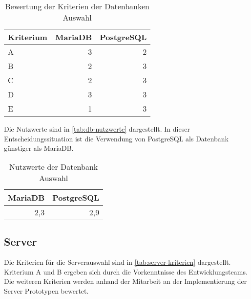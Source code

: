 \begin{table}[h]
	\caption{Bewertung der Kriterien der Datenbanken Auswahl}
	\begin{center}
		\begin{tabular}{lrr}
			\toprule
			Kriterium & \multicolumn{1}{l}{MariaDB} & \multicolumn{1}{l}{PostgreSQL} \\ \midrule
			A         &                           3 &                              2 \\
			B         &                           2 &                              3 \\
			C         &                           2 &                              3 \\
			D         &                           3 &                              3 \\
			E         &                           1 &                              3 \\ \bottomrule
		\end{tabular}
	\end{center}
	\label{tab:db-bewertung}
\end{table}

Die Nutzwerte sind in \autoref{tab:db-nutzwerte} dargestellt.
In dieser Entscheidungssituation ist die Verwendung von PostgreSQL als Datenbank günstiger als MariaDB.

\begin{table}[h]
	\caption{Nutzwerte der Datenbank Auswahl}
	\begin{center}
		\begin{tabular}{rr}
			\toprule
			MariaDB & PostgreSQL \\ \midrule
			2,3 & 2,9 \\ \bottomrule	
		\end{tabular}
	\end{center}
	\label{tab:db-nutzwerte}
\end{table}

\subsection{Server}
Die Kriterien für die Serverauswahl sind in \autoref{tab:server-kriterien} dargestellt.
Kriterium A und B ergeben sich durch die Vorkenntnisse des Entwicklungsteams.
Die weiteren Kriterien werden anhand der Mitarbeit an der Implementierung der Server Prototypen bewertet.

